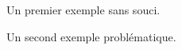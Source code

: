 \documentclass[varwidth, border = 3pt]{standalone}
\begin{document}
Un premier exemple sans souci.



Un second exemple problématique.
 
\end{document}
